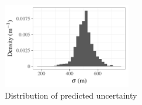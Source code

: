 \documentclass[amt,manuscript]{copernicus}\usepackage[]{graphicx}\usepackage[]{color}
\newenvironment{knitrout}{}{} %
\begin{document}
\begin{figure}
  \centering
\begin{knitrout}
\color{fgcolor}

{\centering \includegraphics[width=0.5\textwidth]{figure/method-combo-eval-rmse-1} 

}



\end{knitrout}
  \caption{Distribution of predicted uncertainty}
  \label{fig:uncertainty}
\end{figure}

\end{document}
